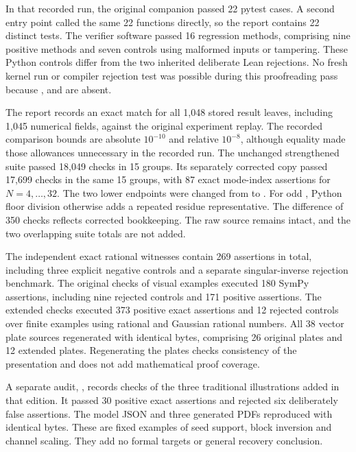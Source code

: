 In that recorded run, the original companion passed 22 pytest cases. A second entry point called the same 22 functions directly, so the report contains 22 distinct tests. The verifier software passed 16 regression methods, comprising nine positive methods and seven controls using malformed inputs or tampering. These Python controls differ from the two inherited deliberate Lean rejections. No fresh kernel run or compiler rejection test was possible during this proofreading pass because ,  and  are absent.

The report records an exact match for all 1,048 stored result leaves, including 1,045 numerical fields, against the original experiment replay. The recorded comparison bounds are absolute $10^{-10}$ and relative $10^{-8}$, although equality made those allowances unnecessary in the recorded run. The unchanged strengthened suite passed 18,049 checks in 15 groups. Its separately corrected copy passed 17,699 checks in the same 15 groups, with 87 exact mode-index assertions for $N=4,\ldots,32$. The two lower endpoints were changed from  to . For odd , Python floor division otherwise adds a repeated residue representative. The difference of 350 checks reflects corrected bookkeeping. The raw source remains intact, and the two overlapping suite totals are not added.

The independent exact rational witnesses contain 269 assertions in total, including three explicit negative controls and a separate singular-inverse rejection benchmark. The original checks of visual examples executed 180 SymPy assertions, including nine rejected controls and 171 positive assertions. The extended checks executed 373 positive exact assertions and 12 rejected controls over finite examples using rational and Gaussian rational numbers. All 38 vector plate sources regenerated with identical bytes, comprising 26 original plates and 12 extended plates. Regenerating the plates checks consistency of the presentation and does not add mathematical proof coverage.

A separate audit, , records checks of the three traditional illustrations added in that edition. It passed 30 positive exact assertions and rejected six deliberately false assertions. The model JSON and three generated PDFs reproduced with identical bytes. These are fixed examples of seed support, block inversion and channel scaling. They add no formal targets or general recovery conclusion.

